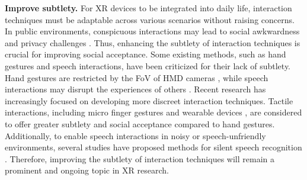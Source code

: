 \documentclass[review]{fcs}
\begin{document}
\textbf{Improve subtlety.}
For XR devices to be integrated into daily life, interaction techniques must be adaptable across various scenarios without raising concerns. In public environments, conspicuous interactions may lead to social awkwardness and privacy challenges \cite{DBLP:conf/ismar/LiLMHLS22}. Thus, enhancing the subtlety of interaction techniques is crucial for improving social acceptance. Some existing methods, such as hand gestures and speech interactions, have been criticized for their lack of subtlety. Hand gestures are restricted by the FoV of HMD cameras \cite{DBLP:conf/chi/XuZKN23}, while speech interactions may disrupt the experiences of others \cite{DBLP:conf/chi/WangYWJ024}. Recent research has increasingly focused on developing more discreet interaction techniques. Tactile interactions, including micro finger gestures \cite{DBLP:conf/ismar/LiLMHLS22, DBLP:conf/chi/XuZKN23, DBLP:journals/imwut/ChenLYZ22, DBLP:conf/iswc/KitamuraYS23} and wearable devices \cite{DBLP:conf/ismar/DasNH23, DBLP:conf/chi/HeLP22}, are considered to offer greater subtlety and social acceptance compared to hand gestures. Additionally, to enable speech interactions in noisy or speech-unfriendly environments, several studies have proposed methods for silent speech recognition \cite{DBLP:journals/tvcg/CaiML24, DBLP:conf/chi/ZhangLHWLGZ23, DBLP:conf/chi/WangSRZ24}. Therefore, improving the subtlety of interaction techniques will remain a prominent and ongoing topic in XR research.




\end{document}
